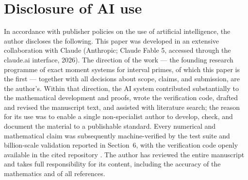 \documentclass[11pt]{article}
\theoremstyle{remark}
\begin{document}
\section*{Disclosure of AI use}

In accordance with publisher policies on the use of artificial intelligence, the author discloses the
following. This paper was developed in an extensive collaboration with Claude (Anthropic; Claude Fable
5, accessed through the claude.ai interface, 2026). The direction of the work --- the founding research
programme of exact moment systems for interval primes, of which this paper is the first --- together
with all decisions about scope, claims, and submission, are the author's. Within that direction, the
AI system contributed substantially to the mathematical development and proofs, wrote the verification
code, drafted and revised the manuscript text, and assisted with literature search; the reason for its
use was to enable a single non-specialist author to develop, check, and document the material to a
publishable standard. Every numerical and mathematical claim was subsequently machine-verified by the
test suite and billion-scale validation reported in Section~6, with the verification code openly
available in the cited repository \cite{Code}. The author has reviewed the entire manuscript and takes
full responsibility for its content, including the accuracy of the mathematics and of all references.
\end{document}
